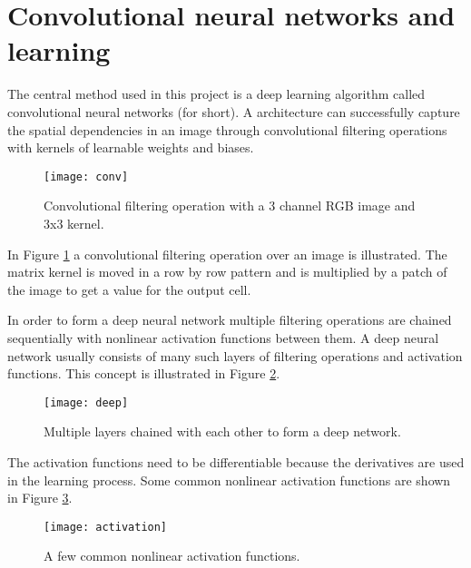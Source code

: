 \section{Convolutional neural networks and learning}

The central method used in this project is a deep learning algorithm called convolutional neural networks (\abbrCNN for short). A \abbrCNN architecture can successfully capture the spatial dependencies in an image through convolutional filtering operations with kernels of learnable weights and biases.

\begin{figure}[H]
	\centering
	\texttt{[image: conv]}
	\caption{Convolutional filtering operation with a 3 channel RGB image and 3x3 kernel.}
	\label{fig:conv}
\end{figure}

In Figure \ref{fig:conv} a convolutional filtering operation over an image is illustrated. The matrix kernel is moved in a row by row pattern and is multiplied by a patch of the image to get a value for the output cell.

In order to form a deep neural network multiple filtering operations are chained sequentially with nonlinear activation functions between them. A deep neural network usually consists of many such layers of filtering operations and activation functions. This concept is illustrated in Figure \ref{fig:deep}.

\begin{figure}[H]
	\centering
	\texttt{[image: deep]}
	\caption{Multiple layers chained with each other to form a deep network.}
	\label{fig:deep}
\end{figure}

The activation functions need to be differentiable because the derivatives are used in the learning process. Some common nonlinear activation functions are shown in Figure \ref{fig:activation}.

\begin{figure}[H]
	\centering
	\texttt{[image: activation]}
	\caption{A few common nonlinear activation functions.}
	\label{fig:activation}
\end{figure}

